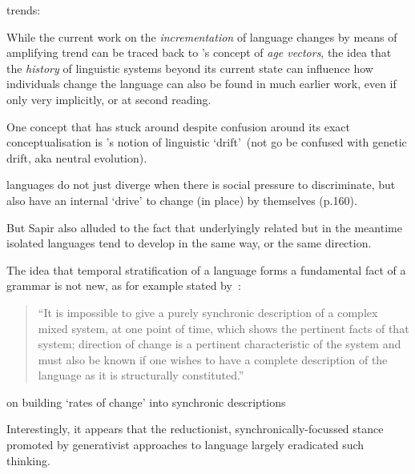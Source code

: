 trends: \citep{Bikhchandani1992,Bikhchandani1998}


While the current work on the \emph{incrementation} of language changes by means of amplifying trend can be traced back to \citet[ch.?]{Labov2001}'s concept of \emph{age vectors}, the idea that the \emph{history} of linguistic systems beyond its current state can influence how individuals change the language can also be found in much earlier work, even if only very implicitly, or at second reading.

One concept that has stuck around despite confusion around its exact conceptualisation %
is \citet{Sapir1921}'s notion of linguistic `drift'~(not go be confused with genetic drift, aka neutral evolution). 

 languages do not just diverge when there is social pressure to discriminate, but also have an internal `drive' to change (in place) by themselves (p.160).

But Sapir also alluded to the fact that underlyingly related but in the meantime isolated languages tend to develop in the same way, or the same direction. 

The idea that temporal stratification of a language forms a fundamental fact of a grammar is not new, as for example stated by~\citet[p.42]{Fries1949}:
\begin{quote}
``It is impossible to give a purely synchronic description of a complex mixed system, at one point of time, which shows the pertinent facts of that system; direction of change is a pertinent characteristic of the system and must also be known if one wishes to have a complete description of the language as it is structurally constituted.''
\end{quote}

\citep{Bailey1970} on building `rates of change' into synchronic descriptions

Interestingly, it appears that the reductionist, synchronically-focussed stance promoted by generativist approaches to language largely eradicated such thinking.

